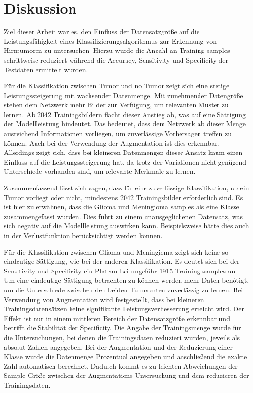 \chapter{Diskussion}
Ziel dieser Arbeit war es, den Einfluss der Datensatzgröße auf die Leistungsfähigkeit eines Klassifizierungsalgorithmus zur Erkennung von Hirntumoren zu untersuchen.
Hierzu wurde die Anzahl an Training samples schrittweise reduziert während die Accuracy, Sensitivity und Specificity der Testdaten ermittelt wurden.

Für die Klassifikation zwischen Tumor und no Tumor zeigt sich eine stetige Leistungssteigerung mit wachsender Datenmenge.
Mit zunehmender Datengröße stehen dem Netzwerk mehr Bilder zur Verfügung, um relevanten Muster zu lernen. 
Ab 2042 Trainingsbildern flacht dieser Anstieg ab, was auf eine Sättigung der Modellleistung hindeutet.
Das bedeutet, dass dem Netzwerk ab dieser Menge ausreichend Informationen vorliegen, um zuverlässige Vorhersagen treffen zu können.
Auch bei der Verwendung der Augmentation ist dies erkennbar.
Allerdings zeigt sich, dass bei kleineren Datenmengen dieser Ansatz kaum einen Einfluss auf die Leistungssteigerung hat, da trotz der Variationen nicht 
genügend Unterschiede vorhanden sind, um relevante Merkmale zu lernen. 

Zusammenfassend lässt sich sagen, dass für eine zuverlässige Klassifikation, ob ein Tumor vorliegt oder nicht, mindestens 2042 Trainingsbilder erforderlich sind.
Es ist hier zu erwähnen, dass die Glioma und Meningioma samples als eine Klasse zusammengefasst wurden.
Dies führt zu einem unausgeglichenen Datensatz, was sich negativ auf die Modellleistung auswirken kann.
Beispielsweise hätte dies auch in der Verlustfunktion berücksichtigt werden können.

Für die Klassifikation zwischen Glioma und Meningioma zeigt sich keine so eindeutige Sättigung, wie bei der anderen Klassifikation.
Es deutet sich bei der Sensitivity und Specificity ein Plateau bei ungefähr 1915 Training samples an. 
Um eine eindeutige Sättigung betrachten zu können werden mehr Daten benötigt, um die Unterschiede zwischen den beiden Tumorarten zuverlässig zu lernen.
Bei Verwendung von Augmentation wird festgestellt, dass bei kleineren Trainingsdatensätzen keine signifikante Leistungsverbesserung erreicht wird. 
Der Effekt ist nur in einem mittleren Bereich der Datensatzgröße erkennbar und betrifft die Stabilität der Specificity. 
Die Angabe der Trainingsmenge wurde für die Untersuchungen, bei denen die Trainingsdaten reduziert wurden, jeweils als absolut Zahlen angegeben.
Bei der Augmentation und der Reduzierung einer Klasse wurde die Datenmenge Prozentual angegeben und anschließend die exakte Zahl automatisch berechnet.
Dadurch kommt es zu leichten Abweichungen der Sample-Größe zwischen der Augmentations Untersuchung und dem reduzieren der Trainingsdaten. 

